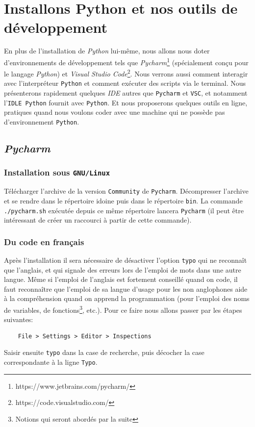 
\chapter{Installons Python et nos outils de développement}
En plus de l'installation de \textit{Python} lui-même, nous allons nous doter d'environnements de développement tels que \textit{Pycharm}\footnote{https://www.jetbrains.com/pycharm/} (spécialement conçu pour le langage \textit{Python}) et \textit{Visual Studio Code}\footnote{https://code.visualstudio.com/}. Nous verrons aussi comment interagir avec l'interpréteur \texttt{Python} et comment exécuter des scripts via le terminal. Nous présenterons rapidement quelques \textit{IDE} autres que \texttt{Pycharm} et \texttt{VSC}, et notamment l'\texttt{IDLE Python} fournit avec \texttt{Python}. Et nous proposerons quelques outils en ligne, pratiques quand nous voulons coder avec une machine qui ne possède pas d'environnement \texttt{Python}.
\medskip

\section{\textit{Pycharm}}
\subsection*{Installation sous \texttt{GNU/Linux}}
Télécharger l'archive de la version \texttt{Community} de \texttt{Pycharm}. Décompresser l'archive et se rendre dans le répertoire idoine puis dans le répertoire \texttt{bin}. La commande \verb|./pycharm.sh| exécutée depuis ce même répertoire lancera \texttt{Pycharm} (il peut être intéressant de créer un raccourci à partir de cette commande).
\medskip

\subsection*{Du code en français}
Après l'installation il sera nécessaire de désactiver l'option \texttt{typo} qui ne reconnaît que l'anglais, et qui signale des erreurs lors de l'emploi de mots dans une autre langue. Même si l'emploi de l'anglais est fortement conseillé quand on code, il faut reconnaître que l'emploi de sa langue d'usage pour les non anglophones aide à la compréhension quand on apprend la programmation (pour l'emploi des noms de variables, de fonctions\footnote{Notions qui seront abordés par la suite}, etc.). Pour ce faire nous allons passer par les étapes suivantes:
\begin{verbatim}
    File > Settings > Editor > Inspections
\end{verbatim}
Saisir ensuite \texttt{typo} dans la case de recherche, puis décocher la case correspondante à la ligne \texttt{Typo}.
\medskip

